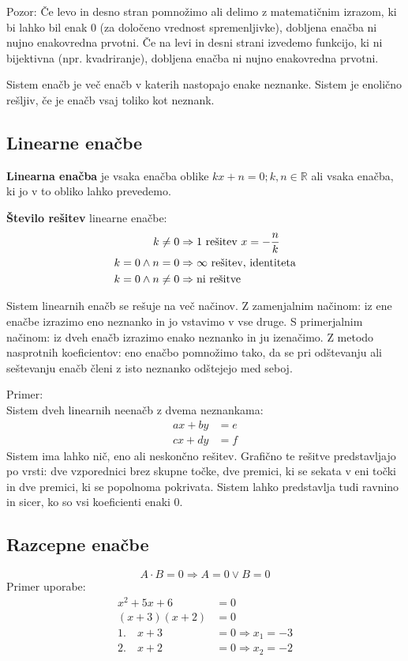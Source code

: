 \documentclass[a4paper,oneside,12pt,fleqn]{article}
\def\R{\ensuremath{\mathbb R}}
\newcommand\krat\cdot
\renewcommand\implies\Rightarrow
\numberwithin{equation}{section}
\begin{document}
Pozor: Če levo in desno stran pomnožimo ali delimo z matematičnim izrazom, ki bi lahko bil
enak 0 (za določeno vrednost spremenljivke), dobljena enačba ni nujno enakovredna prvotni.
Če na levi in desni strani izvedemo funkcijo, ki ni bijektivna (npr. kvadriranje),
dobljena enačba ni nujno enakovredna prvotni.

Sistem enačb je več enačb v katerih nastopajo enake neznanke. Sistem je enolično rešljiv,
če je enačb vsaj toliko kot neznank.

\subsection{Linearne enačbe}
\label{sec:enac:lin}
\textbf{Linearna enačba} je vsaka enačba oblike $kx + n = 0; k, n \in \R$ ali vsaka enačba, ki jo v to
obliko lahko prevedemo.

\textbf{Število rešitev} linearne enačbe:
\begin{align*}
  k \neq 0 &\implies \textnormal{1 rešitev } x = -\frac{n}{k} \\
  k = 0 \land n = 0 &\implies \infty \textnormal{ rešitev, identiteta} \\
  k = 0 \land n \neq 0 &\implies \textnormal{ni rešitve}
\end{align*}

Sistem linearnih enačb se rešuje na več načinov. Z zamenjalnim načinom: iz ene enačbe
izrazimo eno neznanko in jo vstavimo v vse druge. S primerjalnim načinom: iz dveh enačb
izrazimo enako neznanko in ju izenačimo. Z metodo
nasprotnih koeficientov: eno enačbo pomnožimo tako, da se pri odštevanju ali seštevanju
enačb členi z isto neznanko odštejejo med seboj.

Primer:\\
Sistem dveh linearnih neenačb z dvema neznankama:
\begin{align*}
  ax + by &= e \\
  cx + dy &= f
\end{align*}
Sistem ima lahko nič, eno ali neskončno rešitev. Grafično te rešitve predstavljajo po
vrsti: dve vzporednici brez skupne točke, dve premici, ki se sekata v eni točki in dve
premici, ki se popolnoma pokrivata. Sistem lahko predstavlja tudi ravnino in sicer, ko so
vsi koeficienti enaki 0.

\subsection{Razcepne enačbe}
\label{sec:enac:razc}
\[ A \krat B = 0 \implies A = 0 \lor B = 0 \]
Primer uporabe:
\begin{align*}
  x^2 +5x + 6 &= 0 \\
  (x+3)(x+2) &= 0 \\
  1.\quad x + 3 &= 0 \implies x_1 = -3 \\
  2.\quad x + 2 &= 0 \implies x_2 = -2
\end{align*}
\end{document}
